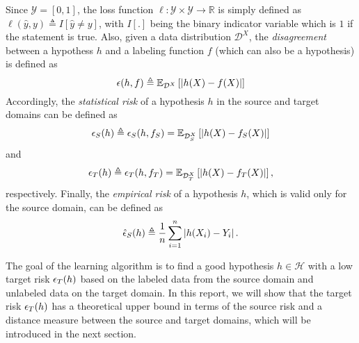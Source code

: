 Since $\mathcal{Y}=[0, 1]$, the loss function $\ell: \mathcal{Y} \times \mathcal{Y} \rightarrow \mathbb{R}$ is simply defined as $\ell (\hat{y},y) \triangleq I \left[ \hat{y} \neq y \right]$, with $I[.]$ being the binary indicator variable which is $1$ if the statement is true. Also, given a data distribution $\mathcal{D}^X$, the \textit{disagreement} between a hypothess $h$ and a labeling function $f$ (which can also be a hypothesis) is defined as
\begin{equation}\label{eq:disagreement}
\epsilon(h, f) \triangleq \mathbb{E}_{\mathcal{D}^X}\left[\left \lvert h(X) - f(X) \right \rvert\right]
\end{equation}
Accordingly, the \textit{statistical risk} of a hypothesis $h$ in the source and target domains can be defined as
\begin{equation}\label{eq:RiskS}
\epsilon_{S}(h) \triangleq \epsilon_{S}(h, f_S) = \mathbb{E}_{\mathcal{D}_S^X}\left[\left \lvert h(X) - f_S(X) \right \rvert\right]
\end{equation}
and
\begin{equation}\label{eq:RiskT}
\epsilon_{T}(h) \triangleq \epsilon_{T}(h, f_T) = \mathbb{E}_{\mathcal{D}_T^X}\left[\left \lvert h(X) - f_T(X) \right \rvert\right],
\end{equation}
respectively. Finally, the \textit{empirical risk} of a hypothesis $h$, which is valid only for the source domain, can be defined as
\begin{equation}\label{eq:ERiskS}
\hat{\epsilon}_{S}(h) \triangleq \frac{1}{n} \sum_{i=1}^{n} \left \lvert h(X_i) - Y_i \right \rvert.
\end{equation}

The goal of the learning algorithm is to find a good hypothesis $h \in \mathcal{H}$ with a low target risk $\epsilon_{T}(h)$ based on the labeled data from the source domain and unlabeled data on the target domain. In this report, we will show that the target risk $\epsilon_{T}(h)$ has a theoretical upper bound in terms of the source risk and a distance measure between the source and target domains, which will be introduced in the next section.



